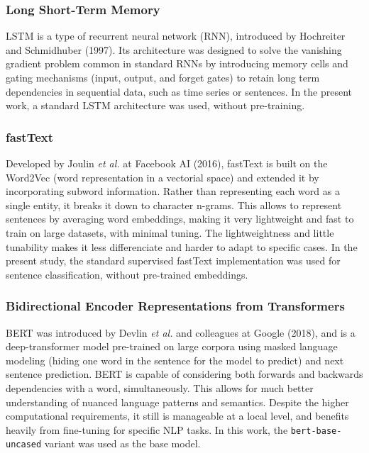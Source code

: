 \documentclass[conference]{IEEEtran}
\begin{document}
\subsubsection{Long Short-Term Memory}

LSTM is a type of recurrent neural network (RNN), introduced by Hochreiter and Schmidhuber (1997). Its architecture was designed to solve the vanishing gradient problem common in standard RNNs by introducing memory cells and gating mechanisms (input, output, and forget gates) to retain long term dependencies in sequential data, such as time series or sentences. In the present work, a standard LSTM architecture was used, without pre-training.

\subsubsection{fastText}

Developed by Joulin \textit{et al.} at Facebook AI (2016), fastText is built on the Word2Vec (word representation in a vectorial space) and extended it by incorporating subword information. Rather than representing each word as a single entity, it breaks it down to character n-grams. This allows to represent sentences by averaging word embeddings, making it very lightweight and fast to train on large datasets, with minimal tuning. The lightweightness and little tunability makes it less differenciate and harder to adapt to specific cases. In the present study, the standard supervised fastText implementation was used for sentence classification, without pre-trained embeddings.

\subsubsection{Bidirectional Encoder Representations from Transformers}

BERT was introduced by Devlin \textit{et al.} and colleagues at Google (2018), and is a deep-transformer model pre-trained on large corpora using masked language modeling (hiding one word in the sentence for the model to predict) and next sentence prediction. BERT is capable of considering both forwards and backwards dependencies with a word, simultaneously. This allows for much better understanding of nuanced language patterns and semantics. Despite the higher computational requirements, it still is manageable at a local level, and benefits heavily from fine-tuning for specific NLP tasks. In this work, the \texttt{bert-base-uncased} variant was used as the base model.
\end{document}
